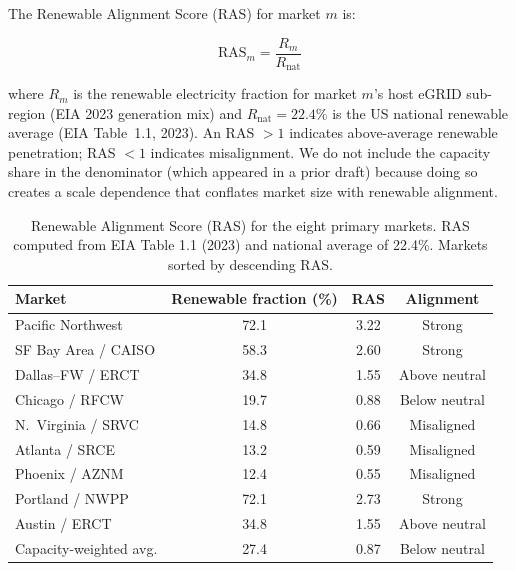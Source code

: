 \documentclass[preprint,12pt]{elsarticle}
\begin{document}
The Renewable Alignment Score (RAS) for market $m$ is:

\begin{equation}
\text{RAS}_m = \frac{R_m}{R_{\text{nat}}}
\label{eq:ras}
\end{equation}

\noindent where $R_m$ is the renewable electricity fraction for market
$m$'s host eGRID sub-region (EIA 2023 generation mix) and
$R_{\text{nat}} = 22.4\%$ is the US national renewable average (EIA
Table~1.1, 2023). An RAS $> 1$ indicates above-average renewable
penetration; RAS $< 1$ indicates misalignment. We do not include the
capacity share in the denominator (which appeared in a prior draft) because
doing so creates a scale dependence that conflates market size with
renewable alignment.

\begin{table}[htbp]
\centering
\caption{Renewable Alignment Score (RAS) for the eight primary markets.
RAS computed from EIA Table 1.1 (2023) and national average of 22.4\%.
Markets sorted by descending RAS.}
\label{tab:ras}
\small
\begin{tabular}{@{}lccc@{}}
\toprule
\textbf{Market} & \textbf{Renewable fraction (\%)} &
\textbf{RAS} & \textbf{Alignment} \\
\midrule
Pacific Northwest & 72.1 & 3.22 & \textcolor{green!50!black}{Strong} \\
SF Bay Area / CAISO & 58.3 & 2.60 & \textcolor{green!50!black}{Strong} \\
Dallas--FW / ERCT & 34.8 & 1.55 & \textcolor{green!50!black}{Above neutral} \\
Chicago / RFCW & 19.7 & 0.88 & \textcolor{red!60}{Below neutral} \\
N.\ Virginia / SRVC & 14.8 & 0.66 & \textcolor{red!60}{Misaligned} \\
Atlanta / SRCE & 13.2 & 0.59 & \textcolor{red!60}{Misaligned} \\
Phoenix / AZNM & 12.4 & 0.55 & \textcolor{red!60}{Misaligned} \\
Portland / NWPP & 72.1 & 2.73 & \textcolor{green!50!black}{Strong} \\
Austin / ERCT & 34.8 & 1.55 & \textcolor{green!50!black}{Above neutral} \\
\midrule
Capacity-weighted avg. & 27.4 & 0.87 & \textcolor{red!60}{Below neutral} \\
\bottomrule
\end{tabular}
\end{table}
\end{document}
